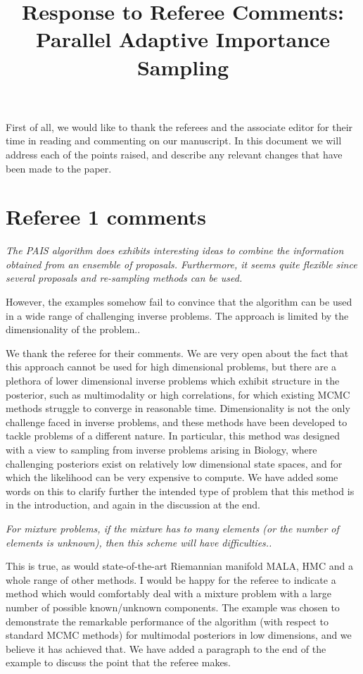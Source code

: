 \documentclass{article}
\newcommand{\comment}[2]{\vspace{0.6cm}{\bf Comment:} {\it #1.}

\vspace{0.3cm}{\bf Answer:} #2}
\begin{document}
\title{Response to Referee Comments: Parallel Adaptive Importance Sampling}
\maketitle
First of all, we would like to thank the referees and the associate editor for
their time in reading and commenting on our manuscript. In this document
we will address each of the points raised, and describe any relevant
changes that have been made to the paper.

\section*{Referee 1 comments}

\comment{The PAIS algorithm does exhibits interesting ideas to combine the information 
obtained from an ensemble of proposals. Furthermore, it seems quite flexible 
since several proposals and re-sampling methods can be used.

However, the examples somehow fail to convince that the algorithm can be used 
in a wide range of challenging inverse problems. The approach is limited by the 
dimensionality of the problem.}{We thank the referee for their comments. We are very open about the fact that this approach cannot be used for high dimensional problems, but there are a plethora of lower dimensional inverse problems which exhibit structure in the posterior, such as multimodality or high correlations, for which existing MCMC methods struggle to converge in reasonable time. Dimensionality is not the only challenge faced in inverse problems, and these methods have been developed to tackle problems of a different nature. In particular, this method was designed with a view to sampling from inverse problems arising in Biology, where challenging posteriors exist on relatively low dimensional state spaces, and for which the likelihood can be very expensive to compute. We have added some words on this to clarify further the intended type of problem that this method is in the introduction, and again in the discussion at the end.}  %

\comment{For mixture problems, if the mixture has to many 
elements (or the number of elements is unknown), then this scheme will have 
difficulties.}{This is true, as would state-of-the-art Riemannian manifold MALA, HMC and a whole range of other methods. I would be happy for the referee to indicate a method which would comfortably deal with a mixture problem with a large number of possible known/unknown components. The example was chosen to demonstrate the remarkable performance of the algorithm (with respect to standard MCMC methods) for multimodal posteriors in low dimensions, and we believe it has achieved that. We have added a paragraph to the end of the example to discuss the point that the referee makes.}%
\end{document}
